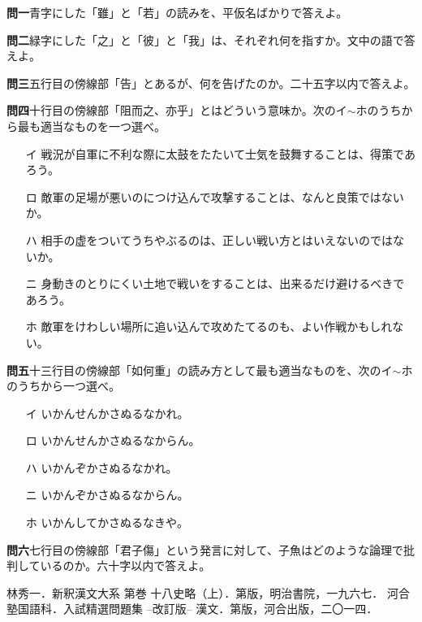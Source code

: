 \documentclass[a4j,landscape,twocolumn]{tarticle}
\newcommand{\re}[3][]{\kundoku{#2}{#1}{#3}{レ }}
\newcommand{\ichi}[3][]{\kundoku{#2}{#1}{#3}{一}}
\renewcommand{\ni}[3][]{\kundoku{#2}{#1}{#3}{二}}
\newcommand{\midashi}[1]{\noindent \textbf{#1}}
\newcommand{\sukima}{\vspace{\baselineskip}}
\begin{document}
\sukima
{}
\midashi{問一\quad}青字にした「雖」と「若」の読みを、平仮名ばかりで答えよ。
\par\vspace{0.5\baselineskip}
\midashi{問二\quad}緑字にした「之」と「彼」と「我」は、それぞれ何を指すか。文中の語で答えよ。
\par\vspace{0.5\baselineskip}
\midashi{問三\quad}五行目の傍線部「告」とあるが、何を告げたのか。二十五字以内で答えよ。
\par\vspace{0.5\baselineskip}
\midashi{問四\quad}十行目の傍線部「阻而\re{鼓}{}之、\ni{不}{}亦\ichi{可}{}乎」とはどういう意味か。次のイ$\sim$ホのうちから最も適当なものを一つ選べ。
\begin{itemize}
	\item[イ]\quad 戦況が自軍に不利な際に太鼓をたたいて士気を鼓舞することは、得策であろう。
	\item[ロ]\quad 敵軍の足場が悪いのにつけ込んで攻撃することは、なんと良策ではないか。
	\item[ハ]\quad 相手の虚をついてうちやぶるのは、正しい戦い方とはいえないのではないか。
	\item[ニ]\quad 身動きのとりにくい土地で戦いをすることは、出来るだけ避けるべきであろう。
	\item[ホ]\quad 敵軍をけわしい場所に追い込んで攻めたてるのも、よい作戦かもしれない。
\end{itemize}
\par\vspace{0.5\baselineskip}
\midashi{問五\quad}十三行目の傍線部「如何\re{勿}{}重」の読み方として最も適当なものを、次のイ$\sim$ホのうちから一つ選べ。
\begin{itemize}
	\item[イ]\quad いかんせんかさぬるなかれ。
	\item[ロ]\quad いかんせんかさぬるなからん。
	\item[ハ]\quad いかんぞかさぬるなかれ。
	\item[ニ]\quad いかんぞかさぬるなからん。
	\item[ホ]\quad いかんしてかさぬるなきや。
\end{itemize}
\par\vspace{0.5\baselineskip}
\midashi{問六\quad}七行目の傍線部「君子\re{不}{}\re{重}{}傷」という発言に対して、子魚はどのような論理で批判しているのか。六十字以内で答えよ。

\vfill

\begin{thebibliography}{9}
林秀一．新釈漢文大系 第巻 十八史略（上）．第版，明治書院，一九六七．
河合塾国語科．入試精選問題集 --改訂版-- 漢文．第版，河合出版，二〇一四．
\end{thebibliography}
\end{document}
